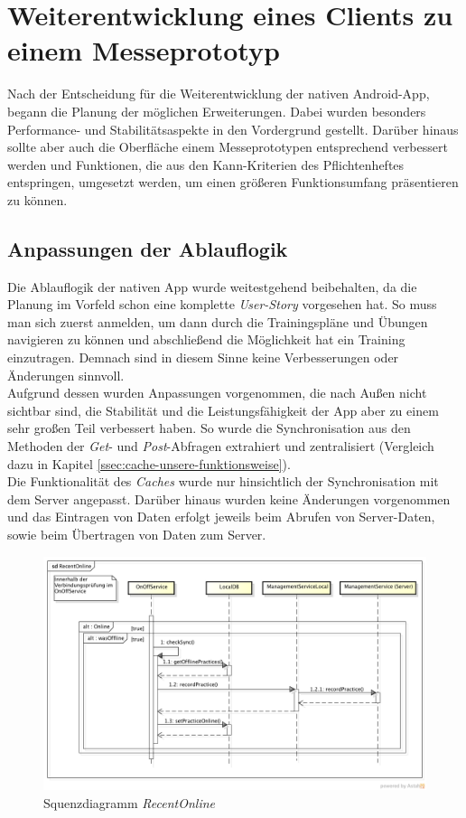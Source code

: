 \chapter{Weiterentwicklung eines Clients zu einem Messeprototyp}
\label{cha:weiterentwicklung-messeprototyp}
Nach der Entscheidung für die Weiterentwicklung der nativen Android-App, begann die Planung der möglichen Erweiterungen. Dabei wurden besonders Performance- und Stabilitätsaspekte in den Vordergrund gestellt. Darüber hinaus sollte aber auch die Oberfläche einem Messeprototypen entsprechend verbessert werden und Funktionen, die aus den Kann-Kriterien des Pflichtenheftes entspringen, umgesetzt werden, um einen größeren Funktionsumfang präsentieren zu können.

\section{Anpassungen der Ablauflogik}
\label{sec:anpassungen-ablauflogik}
Die Ablauflogik der nativen App wurde weitestgehend beibehalten, da die Planung im Vorfeld schon eine komplette \textit{User-Story} vorgesehen hat. So muss man sich zuerst anmelden, um dann durch die Trainingspläne und Übungen navigieren zu können und abschließend die Möglichkeit hat ein Training einzutragen. Demnach sind in diesem Sinne keine Verbesserungen oder Änderungen sinnvoll.\\
Aufgrund dessen wurden Anpassungen vorgenommen, die nach Außen nicht sichtbar sind, die Stabilität und die Leistungsfähigkeit der App aber zu einem sehr großen Teil verbessert haben. So wurde die Synchronisation aus den Methoden der \textit{Get}- und \textit{Post}-Abfragen extrahiert und zentralisiert (Vergleich dazu in Kapitel \ref{ssec:cache-unsere-funktionsweise}).\\
Die Funktionalität des \textit{Caches} wurde nur hinsichtlich der Synchronisation mit dem Server angepasst.  Darüber hinaus wurden keine Änderungen vorgenommen und das Eintragen von Daten erfolgt jeweils beim Abrufen von Server-Daten, sowie beim Übertragen von Daten zum Server.
\begin{figure}[h]
\centering
\includegraphics[width=\linewidth]{content/images/fITNat-RecentOnline}
\caption{Squenzdiagramm \textit{RecentOnline}}
\label{pic:nat-RecentOnline}
\end{figure}
